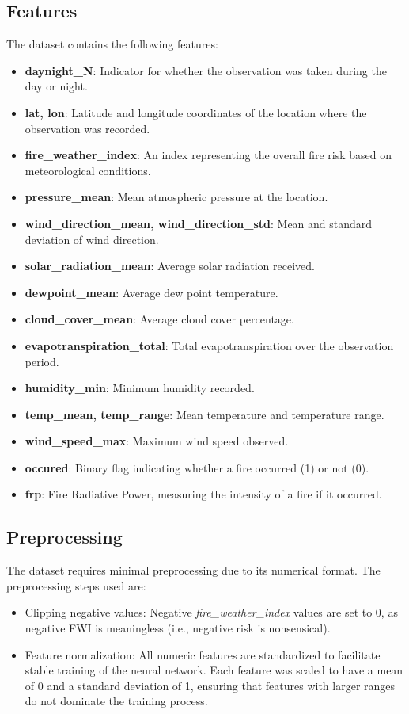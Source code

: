 \documentclass[11pt]{article}
\begin{document}
\subsection{Features}\label{Features}
The dataset contains the following features:
\begin{itemize}
  \item \textbf{daynight\_N}: Indicator for whether the observation was taken during the day or night.
  \item \textbf{lat, lon}: Latitude and longitude coordinates of the location where the observation was recorded.
  \item \textbf{fire\_weather\_index}: An index representing the overall fire risk based on meteorological conditions.
  \item \textbf{pressure\_mean}: Mean atmospheric pressure at the location.
  \item \textbf{wind\_direction\_mean, wind\_direction\_std}: Mean and standard deviation of wind direction.
  \item \textbf{solar\_radiation\_mean}: Average solar radiation received.
  \item \textbf{dewpoint\_mean}: Average dew point temperature.
  \item \textbf{cloud\_cover\_mean}: Average cloud cover percentage.
  \item \textbf{evapotranspiration\_total}: Total evapotranspiration over the observation period.
  \item \textbf{humidity\_min}: Minimum humidity recorded.
  \item \textbf{temp\_mean, temp\_range}: Mean temperature and temperature range.
  \item \textbf{wind\_speed\_max}: Maximum wind speed observed.
  \item \textbf{occured}: Binary flag indicating whether a fire occurred (1) or not (0).
  \item \textbf{frp}: Fire Radiative Power, measuring the intensity of a fire if it occurred.
\end{itemize}

\subsection{Preprocessing}
The dataset requires minimal preprocessing due to its numerical format. The preprocessing steps used are:
\begin{itemize}
  \item Clipping negative values: Negative \textit{fire\_weather\_index} values are set to 0, as negative FWI is meaningless (i.e., negative risk is nonsensical).
  \item Feature normalization: All numeric features are standardized to facilitate stable training of the neural network. Each feature was scaled to have a mean of 0
  and a standard deviation of 1, ensuring that features with larger ranges do not dominate the training process.
\end{itemize}
\end{document}
